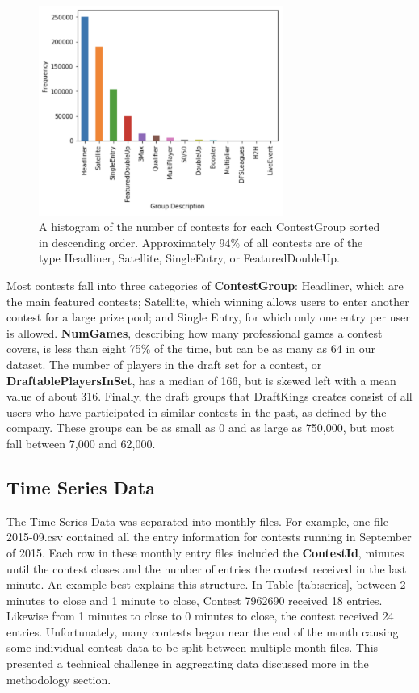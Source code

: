 \begin{figure}
\centering
\includegraphics[width=8cm]{body/background/ContestGroup.png}
\caption[ContestGroup Histogram]{A histogram of the number of contests for each ContestGroup sorted in descending order. Approximately 94\% of all contests are of the type Headliner, Satellite, SingleEntry, or FeaturedDoubleUp.}
\label{fig:contestgroup}
\end{figure}

Most contests fall into three categories of \textbf{ContestGroup}: Headliner, which are the main featured contests; Satellite, which winning allows users to enter another contest for a large prize pool; and Single Entry, for which only one entry per user is allowed. \textbf{NumGames}, describing how many professional games a contest covers, is less than eight 75\% of the time, but can be as many as 64 in our dataset. The number of players in the draft set for a contest, or \textbf{DraftablePlayersInSet}, has a median of 166, but is skewed left with a mean value of about 316. Finally, the draft groups that DraftKings creates consist of all users who have participated in similar contests in the past, as defined by the company. These groups can be as small as 0 and as large as 750,000, but most fall between 7,000 and 62,000. \newline


\subsection{Time Series Data}

The Time Series Data was separated into monthly files. For example, one file 2015-09.csv contained all the entry information for contests running in September of 2015. Each row in these monthly entry files included the \textbf{ContestId}, minutes until the contest closes and the number of entries the contest received in the last minute. An example best explains this structure. In Table \ref{tab:series}, between 2 minutes to close and 1 minute to close, Contest 7962690 received 18 entries. Likewise from 1 minutes to close to 0 minutes to close, the contest received 24 entries. Unfortunately, many contests began near the end of the month causing some individual contest data to be split between multiple month files. This presented a technical challenge in aggregating data discussed more in the methodology section.


